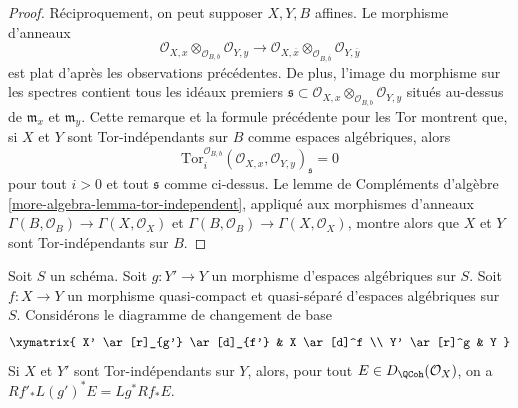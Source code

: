 \begin{proof}
\medskip\noindent
R\'eciproquement, on peut supposer $X,Y,B$ affines. Le morphisme d'anneaux
$$
\mathcal{O}_{X, x} \otimes_{\mathcal{O}_{B, b}} \mathcal{O}_{Y, y}
\longrightarrow
\mathcal{O}_{X, \overline{x}} \otimes_{\mathcal{O}_{B, \overline{b}}}
\mathcal{O}_{Y, \overline y}
$$
est plat d'apr\`es les observations pr\'ec\'edentes. De plus, l'image du
morphisme sur les spectres contient tous les id\'eaux premiers
$\mathfrak s\subset
\mathcal{O}_{X,x}\otimes_{\mathcal{O}_{B,b}}\mathcal{O}_{Y,y}$ situ\'es
au-dessus de $\mathfrak m_x$ et $\mathfrak m_y$. Cette remarque et la formule
pr\'ec\'edente pour les Tor montrent que, si $X$ et $Y$ sont
Tor-ind\'ependants sur $B$ comme espaces alg\'ebriques, alors
$$
\text{Tor}_i^{\mathcal{O}_{B, b}}
(\mathcal{O}_{X, x}, \mathcal{O}_{Y, y})_\mathfrak s = 0
$$
pour tout $i>0$ et tout $\mathfrak s$ comme ci-dessus. Le lemme de Compl\'ements
d'alg\`ebre \ref{more-algebra-lemma-tor-independent}, appliqu\'e aux morphismes
d'anneaux
$\Gamma(B,\mathcal{O}_B)\to\Gamma(X,\mathcal{O}_X)$ et
$\Gamma(B,\mathcal{O}_B)\to\Gamma(X,\mathcal{O}_X)$, montre alors que $X$ et
$Y$ sont Tor-ind\'ependants sur $B$.
\end{proof}

\begin{lemma}
\label{lemma-compare-base-change}
Soit $S$ un sch\'ema. Soit $g:Y'\to Y$ un morphisme d'espaces alg\'ebriques
sur $S$. Soit $f:X\to Y$ un morphisme quasi-compact et quasi-s\'epar\'e
d'espaces alg\'ebriques sur $S$. Consid\'erons le diagramme de changement de
base
$$
\xymatrix{
X' \ar[r]_{g'} \ar[d]_{f'} &
X \ar[d]^f \\
Y' \ar[r]^g &
Y
}
$$
Si $X$ et $Y'$ sont Tor-ind\'ependants sur $Y$, alors, pour tout
$E\in D_\QCoh(\mathcal{O}_X)$, on a
$Rf'_*L(g')^*E=Lg^*Rf_*E$.
\end{lemma}

